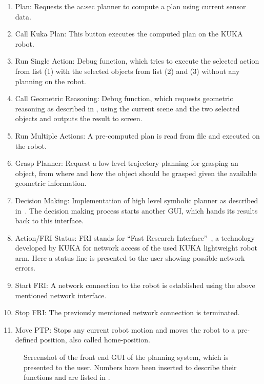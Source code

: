 \begin{enumerate}
  \item Plan: Requests the \gls{ac:sec} planner to compute a plan using current sensor data.
  \item Call Kuka Plan: This button executes the computed plan on the KUKA robot.
  \item Run Single Action: Debug function, which tries to execute the selected action from list (1) with the selected objects from list (2) and (3) without any planning on the robot.
  \item Call Geometric Reasoning: Debug function, which requests geometric reasoning as described in , using the current scene and the two selected objects and outputs the result to screen.
  \item Run Multiple Actions: A pre-computed plan is read from file and executed on the robot.
  \item Grasp Planner: Request a low level trajectory planning for grasping an object, \eg from where and how the object should be grasped given the available geometric information.
  \item Decision Making: Implementation of high level symbolic planner as described in~\cite{agostinitorraswoergoetter2017}. The decision making process starts another GUI, which hands its results back to this interface.
  \item Action/FRI Status: FRI stands for ``Fast Research Interface''~\cite{schreiber2010fast}, a technology developed by KUKA for network access of the used KUKA light\-weight robot arm. Here a status line is presented to the user showing possible network errors.
  \item Start FRI: A network connection to the robot is established using the above mentioned network interface.
  \item Stop FRI: The previously mentioned network connection is terminated.
  \item Move PTP: Stops any current robot motion and moves the robot to a pre-defined position, also called home-position.
\end{enumerate}

\begin{figure}
  \centering
  
  \caption{Screenshot of the front end GUI of the planning system, which is presented to the user. Numbers have been inserted to describe their functions and are listed in .}
  \label{fig:sec_usingaffordanceforplanning_gui}
\end{figure}





